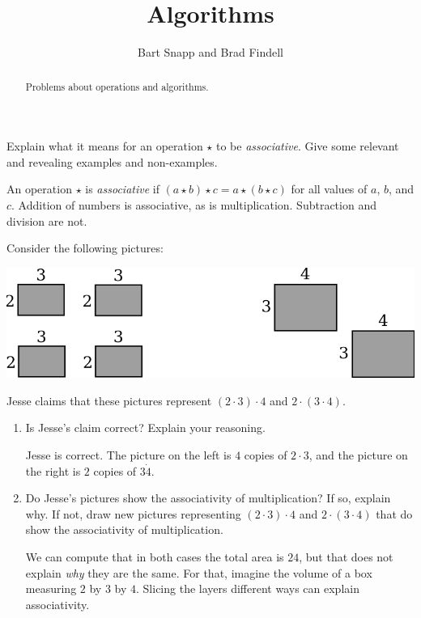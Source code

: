\documentclass[nooutcomes]{ximera}
\title{Algorithms}
\author{Bart Snapp and Brad Findell}
\begin{document}
\begin{abstract}
Problems about operations and algorithms. 
\end{abstract}
\maketitle


\begin{problem}Explain what it means for an operation $\star$ to be
  \textit{associative}. Give some relevant and revealing examples and non-examples.
\begin{freeResponse}
\begin{hint}
An operation $\star$ is \textit{associative} if $(a\star b)\star c = a\star (b\star c)$ for all values of $a$, $b$, and $c$.  Addition of numbers is associative, as is multiplication.  Subtraction and division are not.  
\end{hint}
\end{freeResponse}
\end{problem} 

\begin{problem}\label{P:MA}Consider the following pictures:
\begin{image}
\includegraphics{assMult.png}
\end{image}
Jesse claims that these pictures represent $(2\cdot 3)\cdot 4$ and
$2\cdot (3\cdot 4)$.
\begin{enumerate}
\item Is Jesse's claim correct? Explain your reasoning.
\begin{freeResponse}
\begin{hint}
Jesse is correct.  The picture on the left is $4$ copies of $2\cdot 3$, and the picture on the right is $2$ copies of $3\dot 4$.  
\end{hint}
\end{freeResponse}
\item Do Jesse's pictures show the associativity of multiplication? If
  so, explain why. If not, draw new pictures representing $(2\cdot
  3)\cdot 4$ and $2\cdot (3\cdot 4)$ that do show the associativity
  of multiplication.
\begin{freeResponse}
\begin{hint}
We can compute that in both cases the total area is $24$, but that does not explain \textit{why} they are the same.  For that, imagine the volume of a box measuring $2$ by $3$ by $4$.  Slicing the layers different ways can explain associativity.  
\end{hint}
\end{freeResponse}
\end{enumerate}
\end{problem} 
\end{document}

